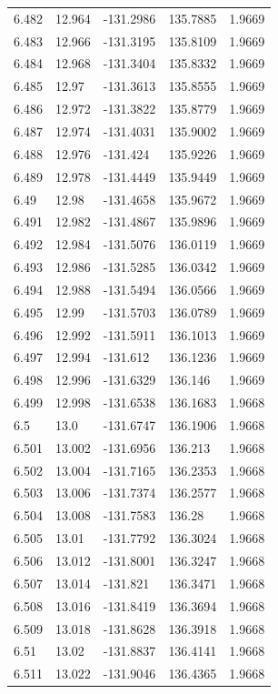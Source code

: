 \begin{tabular}{lllll}
6.482 & 12.964 & -131.2986 & 135.7885 & 1.9669 \\
6.483 & 12.966 & -131.3195 & 135.8109 & 1.9669 \\
6.484 & 12.968 & -131.3404 & 135.8332 & 1.9669 \\
6.485 & 12.97 & -131.3613 & 135.8555 & 1.9669 \\
6.486 & 12.972 & -131.3822 & 135.8779 & 1.9669 \\
6.487 & 12.974 & -131.4031 & 135.9002 & 1.9669 \\
6.488 & 12.976 & -131.424 & 135.9226 & 1.9669 \\
6.489 & 12.978 & -131.4449 & 135.9449 & 1.9669 \\
6.49 & 12.98 & -131.4658 & 135.9672 & 1.9669 \\
6.491 & 12.982 & -131.4867 & 135.9896 & 1.9669 \\
6.492 & 12.984 & -131.5076 & 136.0119 & 1.9669 \\
6.493 & 12.986 & -131.5285 & 136.0342 & 1.9669 \\
6.494 & 12.988 & -131.5494 & 136.0566 & 1.9669 \\
6.495 & 12.99 & -131.5703 & 136.0789 & 1.9669 \\
6.496 & 12.992 & -131.5911 & 136.1013 & 1.9669 \\
6.497 & 12.994 & -131.612 & 136.1236 & 1.9669 \\
6.498 & 12.996 & -131.6329 & 136.146 & 1.9669 \\
6.499 & 12.998 & -131.6538 & 136.1683 & 1.9668 \\
6.5 & 13.0 & -131.6747 & 136.1906 & 1.9668 \\
6.501 & 13.002 & -131.6956 & 136.213 & 1.9668 \\
6.502 & 13.004 & -131.7165 & 136.2353 & 1.9668 \\
6.503 & 13.006 & -131.7374 & 136.2577 & 1.9668 \\
6.504 & 13.008 & -131.7583 & 136.28 & 1.9668 \\
6.505 & 13.01 & -131.7792 & 136.3024 & 1.9668 \\
6.506 & 13.012 & -131.8001 & 136.3247 & 1.9668 \\
6.507 & 13.014 & -131.821 & 136.3471 & 1.9668 \\
6.508 & 13.016 & -131.8419 & 136.3694 & 1.9668 \\
6.509 & 13.018 & -131.8628 & 136.3918 & 1.9668 \\
6.51 & 13.02 & -131.8837 & 136.4141 & 1.9668 \\
6.511 & 13.022 & -131.9046 & 136.4365 & 1.9668 \\

\end{tabular}
